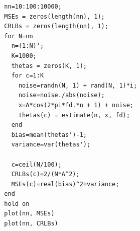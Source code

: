 \documentclass[conference,9pt]{IEEEtran}
\begin{document}
\begin{verbatim}
  nn=10:100:10000;    
  MSEs = zeros(length(nn), 1);
  CRLBs = zeros(length(nn), 1);
  for N=nn
    n=(1:N)';
    K=1000;
    thetas = zeros(K, 1);
    for c=1:K
      noise=randn(N, 1) + rand(N, 1)*i;
      noise=noise./abs(noise);
      x=A*cos(2*pi*fd.*n + 1) + noise;
      thetas(c) = estimate(n, x, fd);
    end
    bias=mean(thetas')-1;
    variance=var(thetas');
  
    c=ceil(N/100);
    CRLBs(c)=2/(N*A^2);
    MSEs(c)=real(bias)^2+variance;
  end
  hold on
  plot(nn, MSEs)
  plot(nn, CRLBs)
\end{verbatim}
\end{document}
